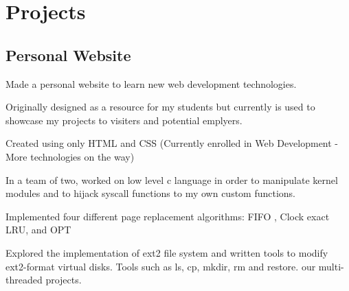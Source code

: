 \documentclass[]{dans-resume}
\begin{document}
\begin{minipage}[t]{0.66\textwidth}
\section{Projects}

\subsection{Personal Website}
\vspace{\topsep}
\begin{tightemize}\item Made a personal website to learn new web development technologies.
\item Originally designed as a resource for my students but currently is used to  showcase
my projects to visiters and potential emplyers.
\item Created using only HTML and CSS (Currently enrolled in Web Development - More
technologies on the way)
\end{tightemize}
\sectionsep

\begin{tightemize}
  \item In a team of two, worked on low level c language in order to manipulate
  kernel modules and to hijack syscall functions to my own custom functions.
  \item Implemented four different page replacement algorithms: FIFO , Clock
   exact LRU, and OPT
  \item Explored the implementation of ext2 file system and written tools to
  modify ext2-format virtual disks. Tools such as ls, cp, mkdir, rm and restore.
  our multi-threaded projects.
\end{tightemize}
\sectionsep



\end{minipage}
\end{document}
